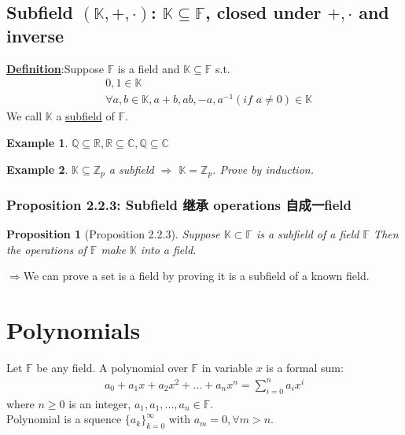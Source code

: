 \documentclass[11pt,a4paper]{article}
\newtheorem{proposition}{Proposition}
\newtheorem{example}{Example}
\begin{document}
\subsection{Subfield $(\mathbb{K},+,\cdot)$: $\mathbb{K}\subseteq \mathbb{F}$, closed under $+,\cdot$ and inverse}
\textbf{\underline{Definition}}:Suppose $\mathbb{F}$ is a field and $\mathbb{K}\subseteq \mathbb{F}$ s.t.
\begin{equation}
    \begin{aligned}
        &0,1\in\mathbb{K}\\
        &\forall a,b\in\mathbb{K}, a+b,ab,-a,a^{-1}(\textit{if }a\neq0)\in\mathbb{K}
    \end{aligned}
    \nonumber
\end{equation}
We call $\mathbb{K}$ a \underline{subfield} of $\mathbb{F}$.
\begin{example}
$\mathbb{Q}\subseteq\mathbb{R},\mathbb{R}\subseteq\mathbb{C},\mathbb{Q}\subseteq\mathbb{C}$
\end{example}
\begin{example}
    $\mathbb{K}\subseteq \mathbb{Z}_p$ a subfield $\Rightarrow$ $\mathbb{K}=\mathbb{Z}_p$. Prove by induction.
\end{example}

\subsubsection{Proposition 2.2.3: Subfield 继承 operations 自成一field}
\begin{proposition}[Proposition 2.2.3]
    Suppose $\mathbb{K}\subset \mathbb{F}$ is a subfield of a field $\mathbb{F}$
    Then the operations of $\mathbb{F}$ make $\mathbb{K}$ into a field.
\end{proposition}
$\Rightarrow$We can prove a set is a field by proving it is a subfield of a known field.


\section{Polynomials}
Let $\mathbb{F}$ be any field. A polynomial over $\mathbb{F}$ in variable $x$ is a formal sum:
\begin{equation}
    \begin{aligned}
        a_0+a_1x+a_2x^2+...+a_nx^n=\sum_{i=0}^na_ix^i
    \end{aligned}
    \nonumber
\end{equation}
where $n\geq 0$ is an integer, $a_1,a_1,...,a_n\in\mathbb{F}$.\\
Polynomial is a squence $\{a_k\}_{k=0}^{\infty}$ with $a_m=0,\forall m>n$.
\end{document}
